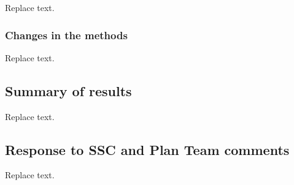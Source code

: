 \documentclass[11pt,
  english,
  a4paper,
]{article}
\begin{document}

Replace text.

\leavevmode\tagmcend\tagstructend\par


\hypertarget{changes-in-the-methods}{%
\subsubsection*{Changes in the methods}\label{changes-in-the-methods}}

\leavevmode\tagmcend\tagstructend


Replace text.

\leavevmode\tagmcend\tagstructend\par


\hypertarget{summary-of-results}{%
\subsection*{Summary of results}\label{summary-of-results}}

\leavevmode\tagmcend\tagstructend


Replace text.

\leavevmode\tagmcend\tagstructend\par


\hypertarget{response-to-ssc-and-plan-team-comments}{%
\subsection*{Response to SSC and Plan Team comments}\label{response-to-ssc-and-plan-team-comments}}

\leavevmode\tagmcend\tagstructend


Replace text.

\leavevmode\tagmcend\tagstructend\par
\end{document}
